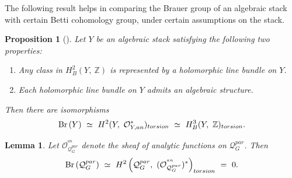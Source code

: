 \documentclass[10pt,reqno]{amsart}
\DeclareMathOperator{\Br}{\textnormal{Br}}
\newcommand{\mc}[1]{\mathcal{#1}}
\newcommand{\bb}[1]{\mathbb{#1}}
\newtheorem{lemma}[theorem]{Lemma}
\newtheorem{proposition}[theorem]{Proposition}
\theoremstyle{myroman}
\numberwithin{equation}{section}
\begin{document}
		The following result helps in comparing the Brauer group of an algebraic stack with certain Betti cohomology
		group, under certain assumptions on the stack.
		
		\begin{proposition}[{\cite[Proposition 2.1]{BH13}}]\label{prop:two-conditions}
			Let $Y$ be an algebraic stack satisfying the following two properties:
			\begin{enumerate}[(1)]
				\item Any class in $H_B^2(Y,\ \bb{Z})$ is represented by a holomorphic line bundle on $Y$.
				\item Each holomorphic line bundle on $Y$ admits an algebraic structure.
			\end{enumerate}
			Then there are isomorphisms
			\begin{equation*}
				\Br\left(Y\right)\ \simeq\ H^2(Y, \ \mc{O}^*_{Y,an})_{torsion}\ \simeq\ H_B^3(Y,\ \bb{Z})_{torsion}.
			\end{equation*}
		\end{proposition}
		
		\begin{lemma}\label{lem:brauer-group-of-qgpar}
			Let $\mc{O}^{^{an}}_{\mc{Q}^{par}_G}$ denote the sheaf of analytic functions on $\mc{Q}^{par}_G$. Then
			$$\Br\left(\mc{Q}^{par}_G\right)\ \simeq\ H^2\left(\mc{Q}_G^{par},\ 
			(\mc{O}^{^{an}}_{\mc{Q}^{par}_G})^*\right)_{torsion}\ =\ 0.$$
		\end{lemma}
		
\end{document}
